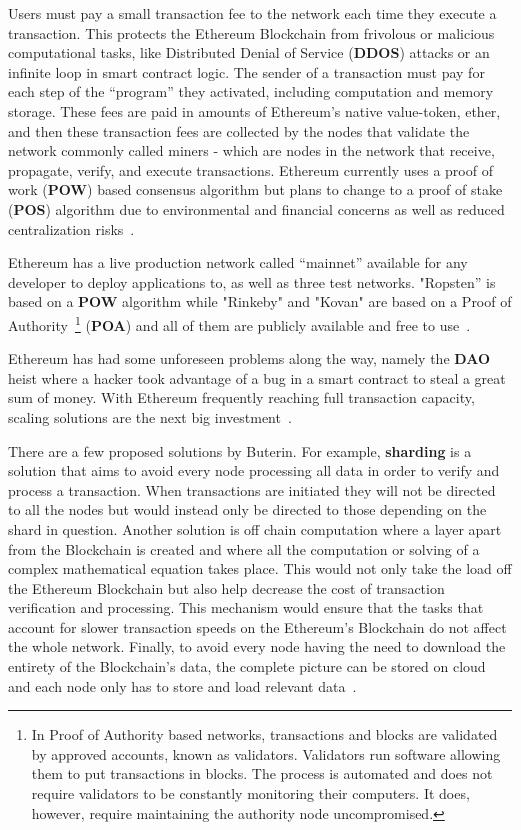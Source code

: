 Users must pay a small transaction fee to the network each time they execute a
transaction. This protects the Ethereum Blockchain from frivolous or malicious
computational tasks, like Distributed Denial of Service (\textbf{DDOS}) attacks
or an infinite loop in smart contract logic. The sender of a transaction must
pay for each step of the “program” they activated, including computation and
memory storage. These fees are paid in amounts of Ethereum’s native
value-token, ether, and then these transaction fees are collected by the nodes
that validate the network commonly called miners - which are nodes in the
network that receive, propagate, verify, and execute transactions. Ethereum
currently uses a proof of work (\textbf{POW}) based consensus algorithm but
plans to change to a proof of stake (\textbf{POS}) algorithm due to
environmental and financial concerns as well as reduced centralization
risks~\cite{EthereumDocs2018,EthereumPOSFAQ2018}.

Ethereum has a live production network called “mainnet” available for any
developer to deploy applications to, as well as three test networks. "Ropsten”
is based on a \textbf{POW} algorithm while "Rinkeby" and "Kovan" are based on a
Proof of Authority~\footnote{In Proof of Authority based networks, transactions
and blocks are validated by approved accounts, known as validators. Validators
run software allowing them to put transactions in blocks. The process is
automated and does not require validators to be constantly monitoring their
computers. It does, however, require maintaining the authority node
uncompromised.} (\textbf{POA}) and all of them are publicly available and free
to use~\cite{Barclay2017,EthereumTestNetworks2018}.

Ethereum has had some unforeseen problems along the way, namely the
\textbf{DAO} heist where a hacker took advantage of a bug in a smart contract
to steal a great sum of money. With Ethereum frequently reaching full
transaction capacity, scaling solutions are the next big
investment~\cite{ethereumScalability2018}.

There are a few proposed solutions by Buterin. For example, \textbf{sharding}
is a solution that aims to avoid every node processing all data in order to
verify and process a transaction. When transactions are initiated they will not
be directed to all the nodes but would instead only be directed to those
depending on the shard in question.  Another solution is off chain computation
where a layer apart from the Blockchain is created and where all the
computation or solving of a complex mathematical equation takes place. This
would not only take the load off the Ethereum Blockchain but also help decrease
the cost of transaction verification and processing. This mechanism would
ensure that the tasks that account for slower transaction speeds on the
Ethereum’s Blockchain do not affect the whole network. Finally, to avoid every
node having the need to download the entirety of the Blockchain's data, the
complete picture can be stored on cloud and each node only has to store and
load relevant data~\cite{ethereumBlogScalability2018}.


